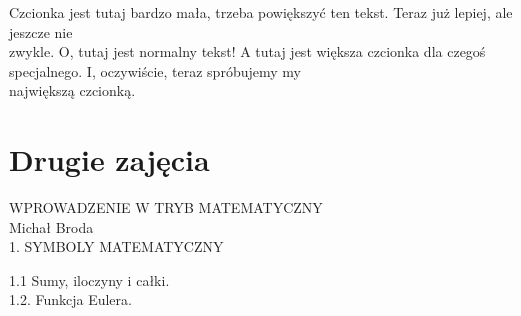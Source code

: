 \documentclass[a4paper,15pt]{book}
\begin{document}
Czcionka jest tutaj bardzo mała, trzeba powiększyć ten tekst. Teraz już lepiej, ale jeszcze nie \\

zwykle. O, tutaj jest normalny tekst! A tutaj jest większa czcionka dla czegoś \\

specjalnego. I, oczywiście, teraz spróbujemy my \\

największą czcionką. \\

\newpage
\part{Drugie zajęcia}
\begin{center}
WPROWADZENIE W TRYB MATEMATYCZNY \\

Michał Broda \\
1. SYMBOLY MATEMATYCZNY \\

\end{center}
1.1 Sumy, iloczyny i całki. \\


1.2. Funkcja Eulera. \\
\end{document}

